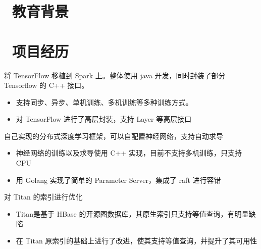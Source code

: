 \documentclass{resume}
\begin{document}




\section{\faGraduationCap\  教育背景}

\section{\faUsers\ 项目经历}
\begin{onehalfspacing}
将 TensorFlow 移植到 Spark 上。整体使用 java 开发，同时封装了部分 Tensorflow 的 C++ 接口。
\begin{itemize}
  \item 支持同步、异步、单机训练、多机训练等多种训练方式。
  \item 对 TensorFlow 进行了高层封装，支持 Layer 等高层接口
\end{itemize}
\end{onehalfspacing}

\begin{onehalfspacing}
自己实现的分布式深度学习框架，可以自配置神经网络，支持自动求导
\begin{itemize}
  \item 神经网络的训练以及求导使用 C++ 实现，目前不支持多机训练，只支持 CPU
  \item 用 Golang 实现了简单的 Parameter Server，集成了 raft 进行容错
\end{itemize}
\end{onehalfspacing}

\begin{onehalfspacing}
对 Titan 的索引进行优化
\begin{itemize}
  \item Titan是基于 HBase 的开源图数据库，其原生索引只支持等值查询，有明显缺陷
  \item 在 Titan 原索引的基础上进行了改进，使其支持等值查询，并提升了其可用性
\end{itemize}
\end{onehalfspacing}
\end{document}
